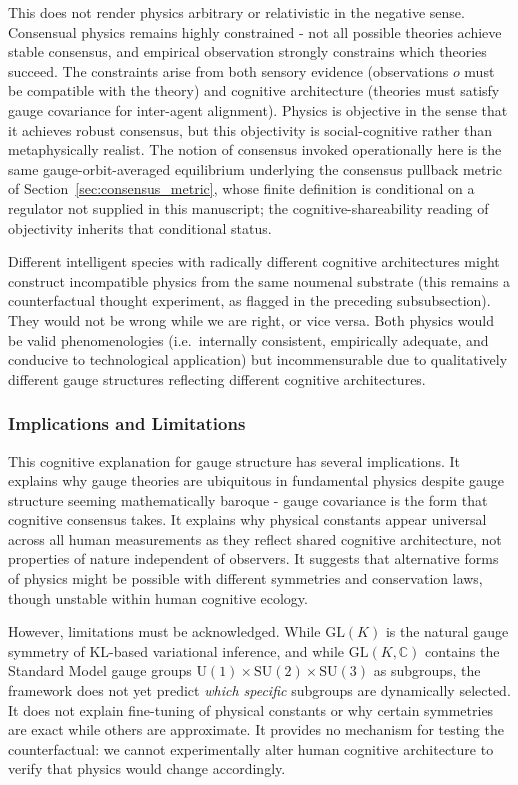 \documentclass[11pt]{article}
\begin{document}
This does not render physics arbitrary or relativistic in the negative sense. Consensual physics remains highly constrained - not all possible theories achieve stable consensus, and empirical observation strongly constrains which theories succeed. The constraints arise from both sensory evidence (observations $o$ must be compatible with the theory) and cognitive architecture (theories must satisfy gauge covariance for inter-agent alignment). Physics is objective in the sense that it achieves robust consensus, but this objectivity is social-cognitive rather than metaphysically realist. The notion of consensus invoked operationally here is the same gauge-orbit-averaged equilibrium underlying the consensus pullback metric of Section~\ref{sec:consensus_metric}, whose finite definition is conditional on a regulator not supplied in this manuscript; the cognitive-shareability reading of objectivity inherits that conditional status.

Different intelligent species with radically different cognitive architectures might construct incompatible physics from the same noumenal substrate (this remains a counterfactual thought experiment, as flagged in the preceding subsubsection). They would not be wrong while we are right, or vice versa. Both physics would be valid phenomenologies (i.e.\ internally consistent, empirically adequate, and conducive to technological application) but incommensurable due to qualitatively different gauge structures reflecting different cognitive architectures.

\subsubsection{Implications and Limitations}

This cognitive explanation for gauge structure has several implications. It explains why gauge theories are ubiquitous in fundamental physics despite gauge structure seeming mathematically baroque - gauge covariance is the form that cognitive consensus takes. It explains why physical constants appear universal across all human measurements as they reflect shared cognitive architecture, not properties of nature independent of observers. It suggests that alternative forms of physics might be possible with different symmetries and conservation laws, though unstable within human cognitive ecology.

However, limitations must be acknowledged. While $\mathrm{GL}(K)$ is the natural gauge symmetry of KL-based variational inference, and while $\mathrm{GL}(K, \mathbb{C})$ contains the Standard Model gauge groups $\mathrm{U}(1) \times \mathrm{SU}(2) \times \mathrm{SU}(3)$ as subgroups, the framework does not yet predict \emph{which specific} subgroups are dynamically selected. It does not explain fine-tuning of physical constants or why certain symmetries are exact while others are approximate. It provides no mechanism for testing the counterfactual: we cannot experimentally alter human cognitive architecture to verify that physics would change accordingly.
\end{document}
